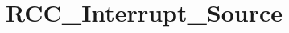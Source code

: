 \hypertarget{group___r_c_c___interrupt___source}{\section{R\-C\-C\-\_\-\-Interrupt\-\_\-\-Source}
\label{group___r_c_c___interrupt___source}
}
